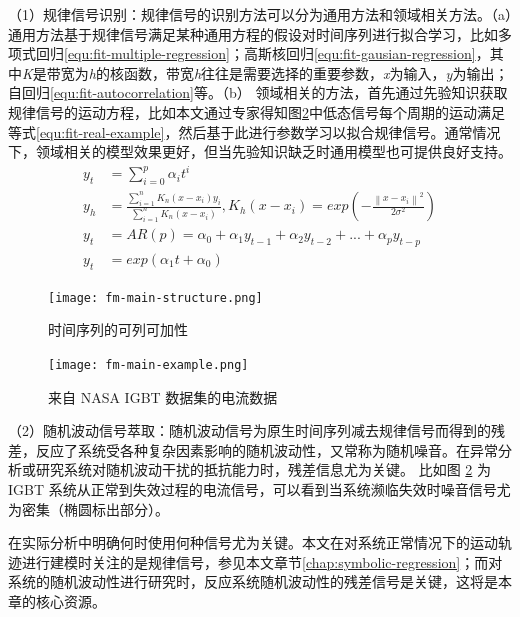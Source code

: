 （1）规律信号识别：规律信号的识别方法可以分为通用方法和领域相关方法。（a）通用方法基于规律信号满足某种通用方程的假设对时间序列进行拟合学习，比如多项式回归\ref{equ:fit-multiple-regression}；高斯核回归\ref{equ:fit-gausian-regression}，其中\emph{K}是带宽为\emph{h}的核函数，带宽\emph{h}往往是需要选择的重要参数，\emph{x}为输入，\emph{y}为输出；自回归\ref{equ:fit-autocorrelation}等。（b） 领域相关的方法，首先通过先验知识获取规律信号的运动方程，比如本文通过专家得知图\ref{fig:fm-main-example}中低态信号每个周期的运动满足等式\ref{equ:fit-real-example}，然后基于此进行参数学习以拟合规律信号。通常情况下，领域相关的模型效果更好，但当先验知识缺乏时通用模型也可提供良好支持。
\begin{subequations}
\begin{align}
y_{t} &=\sum_{i=0}^{p}\alpha_{i}t^{i} \label{equ:fit-multiple-regression}\\
y_{h} &= \frac{\sum_{i=1}^{n}K_{n}(x-x_{i})y_{i}}{\sum_{i=1}^{n}K_{n}(x-x_{i})}, K_{h}(x-x_{i}) = exp(-\frac{\left \| x-x_{i} \right \|^{2}}{2\sigma^{2} }) \label{equ:fit-gausian-regression}\\
y_{t} &= AR(p) = \alpha_{0} + \alpha_{1}y_{t-1} + \alpha_{2}y_{t-2} + ... + \alpha_{p}y_{t-p} \label{equ:fit-autocorrelation}\\
y_{t} &= exp(\alpha_{1}t + \alpha_{0}) \label{equ:fit-real-example}
\end{align}
\end{subequations}
\begin{figure}[H]
\centering
\texttt{[image: fm-main-structure.png]}
\caption{时间序列的可列可加性}
\label{fig:fm-main-structure}
\end{figure}
\begin{figure}[H] 
\centering
\texttt{[image: fm-main-example.png]}
\caption{来自 NASA IGBT 数据集的电流数据}
\label{fig:fm-main-example}
\end{figure}

（2）随机波动信号萃取：随机波动信号为原生时间序列减去规律信号而得到的残差，反应了系统受各种复杂因素影响的随机波动性，又常称为随机噪音。在异常分析或研究系统对随机波动干扰的抵抗能力时，残差信息尤为关键。 比如图 \ref{fig:fm-main-example} 为 IGBT 系统从正常到失效过程的电流信号，可以看到当系统濒临失效时噪音信号尤为密集（椭圆标出部分）。

在实际分析中明确何时使用何种信号尤为关键。本文在对系统正常情况下的运动轨迹进行建模时关注的是规律信号，参见本文章节\ref{chap:symbolic-regression}；而对系统的随机波动性进行研究时，反应系统随机波动性的残差信号是关键，这将是本章的核心资源。



